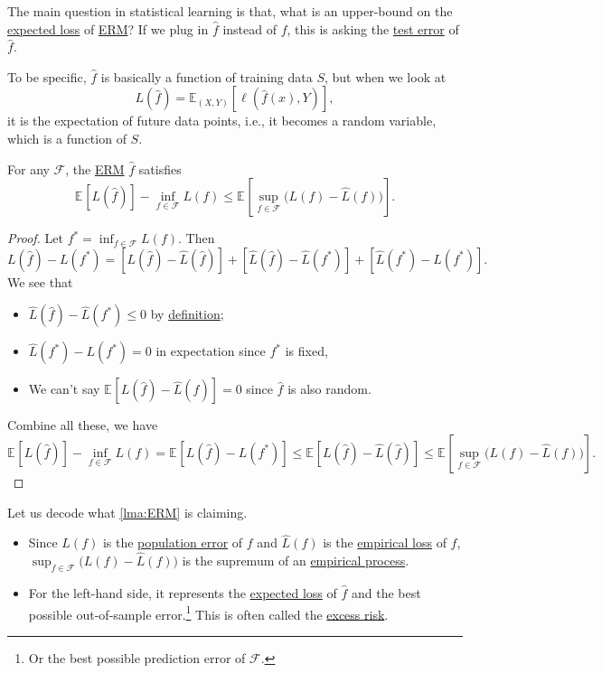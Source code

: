 The main question in statistical learning is that, what is an upper-bound on the \hyperref[def:expected-loss]{expected loss} of \hyperref[prb:ERM]{ERM}? If we plug in \(\hat{f} \) instead of \(f\), this is asking the \hyperref[def:expected-loss]{test error} of \(\hat{f} \).

To be specific, \(\hat{f} \) is basically a function of training data \(S\), but when we look at
\[
	L(\hat{f} ) = \mathbb{E}_{(X, Y)}\left[\ell (\hat{f} (x), Y) \right],
\]
it is the expectation of future data points, i.e., it becomes a random variable, which is a function of \(S\).

\begin{lemma}\label{lma:ERM}
	For any \(\mathscr{F} \), the \hyperref[prb:ERM]{ERM} \(\hat{f} \) satisfies
	\[
		\mathbb{E}_{}[L(\hat{f} ) ] - \inf _{f\in \mathscr{F} } L(f)
		\leq \mathbb{E}_{}\left[\sup _{f\in \mathscr{F} } \big(L(f) - \hat{L} (f) \big) \right] .
	\]
\end{lemma}
\begin{proof}
	Let \(f^{\ast} = \inf _{f\in \mathscr{F} } L(f)\). Then
	\[
		L(\hat{f} ) - L(f^{\ast} )
		= [L(\hat{f} ) - \hat{L} (\hat{f} )] + [\hat{L} (\hat{f} ) - \hat{L} (f^{\ast} )] + [\hat{L} (f^{\ast} ) - L(f^{\ast} )].
	\]
	We see that
	\begin{itemize}
		\item \(\hat{L} (\hat{f} ) - \hat{L} (f^{\ast} ) \leq 0\) by \hyperref[prb:ERM]{definition};
		\item \(\hat{L} (f^{\ast} ) - L(f^{\ast} ) = 0\) in expectation since \(f^{\ast} \) is fixed,
		\item We can't say \(\mathbb{E}_{}[L(\hat{f} ) - \hat{L} (\hat{f} ) ] = 0\) since \(\hat{f} \) is also random.
	\end{itemize}
	Combine all these, we have
	\[
		\mathbb{E}_{}[L(\hat{f} ) ] - \inf _{f\in \mathscr{F} } L(f)
		= \mathbb{E}_{}[ L(\hat{f} ) - L(f^{\ast} ) ]
		\leq \mathbb{E}_{}[ L(\hat{f} ) - \hat{L} (\hat{f} ) ]
		\leq \mathbb{E}_{}\left[ \sup _{f\in \mathscr{F} } \big(L(f) - \hat{L} (f) \big) \right].
	\]
\end{proof}

\begin{note}
	Let us decode what \autoref{lma:ERM} is claiming.
	\begin{itemize}
		\item Since \(L(f)\) is the \hyperref[def:expected-loss]{population error} of \(f\) and \(\hat{L} (f)\) is the \hyperref[def:empirical-loss]{empirical loss} of \(f\), \(\sup _{f\in \mathscr{F} } \big( L(f) - \hat{L} (f) \big)\) is the supremum of an \hyperref[def:EP]{empirical process}.
		\item For the left-hand side, it represents the \hyperref[def:expected-loss]{expected loss} of \(\hat{f} \) and the best possible out-of-sample error.\footnote{Or the best possible prediction error of \(\mathscr{F} \).} This is often called the \hyperref[not:excess-risk]{excess risk}.
	\end{itemize}
\end{note}

